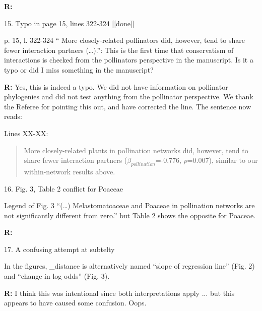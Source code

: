 \documentclass[12pt]{letter}
\newenvironment{refquote}{\bigskip \begin{it}}{\end{it}\smallskip}
\begin{document}
	\textbf{R:}


15. Typo in page 15, lines 322-324 [[done]]

	\begin{refquote}
		p. 15, l. 322-324 “ More closely-related pollinators did, however, tend to share fewer interaction partners (…).”: This is the first time that conservatism of interactions is checked from the pollinators perspective in the manuscript. Is it a typo or did I miss something in the manuscript?
	\end{refquote}


	\textbf{R:} Yes, this is indeed a typo. We did not have information on pollinator phylogenies and did not test anything from the pollinator perspective. We thank the Referee for pointing this out, and have corrected the line. The sentence now reads:

	Lines XX-XX:
	\begin{quotation}
		More closely-related plants in pollination networks did, however, tend to share fewer interaction partners ($\beta_{pollination}$=-0.776, $p$=0.007), similar to our within-network results above.
	\end{quotation}


16. Fig. 3, Table 2 conflict for Poaceae

	\begin{refquote}
		Legend of Fig. 3 “(…) Melastomatoaceae and Poaceae in pollination networks are not significantly different from zero.” but Table 2 shows the opposite for Poaceae.
	\end{refquote}

	\textbf{R:}


17. A confusing attempt at subtelty

	\begin{refquote}
		In the figures, \beta_distance is alternatively named “slope of regression line” (Fig. 2) and “change in log odds” (Fig. 3).
	\end{refquote}


	\textbf{R:} I think this was intentional since both interpretations apply ... but this appears to have caused some confusion. Oops.




\end{document}
